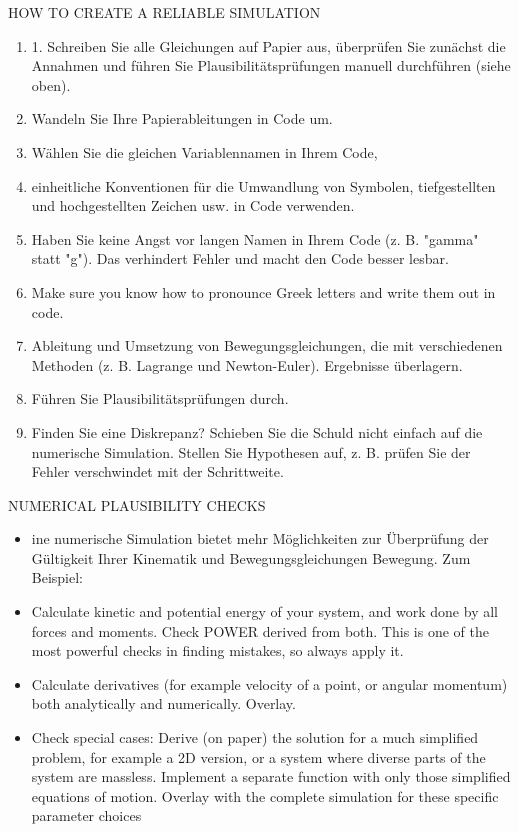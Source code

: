 HOW TO CREATE A RELIABLE SIMULATION
\begin{enumerate}

    \item 1. Schreiben Sie alle Gleichungen auf Papier aus, überprüfen Sie zunächst die Annahmen und führen Sie Plausibilitätsprüfungen 
manuell durchführen (siehe oben). 
    \item Wandeln Sie Ihre Papierableitungen in Code um. 
    \item Wählen Sie die gleichen Variablennamen in Ihrem Code,
    \item 
    einheitliche Konventionen für die Umwandlung von Symbolen, tiefgestellten und hochgestellten Zeichen usw. in Code verwenden. 
    \item Haben Sie keine Angst vor langen Namen in Ihrem Code (z. B. "gamma" statt "g"). Das verhindert Fehler und macht den Code besser lesbar. 
    \item Make sure you know how to pronounce Greek letters and write them out in code. 
    \item Ableitung und Umsetzung von Bewegungsgleichungen, die mit verschiedenen Methoden (z. B. Lagrange 
und Newton-Euler). Ergebnisse überlagern. 
    \item Führen Sie Plausibilitätsprüfungen durch. 
    \item Finden Sie eine Diskrepanz? Schieben Sie die Schuld nicht einfach auf die numerische Simulation. Stellen Sie Hypothesen auf, z. B. prüfen Sie 
der Fehler verschwindet mit der Schrittweite.
\end{enumerate}



NUMERICAL PLAUSIBILITY CHECKS
\begin{itemize}
    \item ine numerische Simulation bietet mehr Möglichkeiten zur Überprüfung der Gültigkeit Ihrer Kinematik und Bewegungsgleichungen 
Bewegung. Zum Beispiel:
    \item Calculate kinetic and potential energy of your system, and work done by all forces and 
moments. Check POWER derived from both. This is one of the most powerful checks in finding 
mistakes, so always apply it.
    \item Calculate derivatives (for example velocity of a point, or angular momentum) both analytically 
and numerically. Overlay. 
    \item Check special cases: Derive (on paper) the solution for a much simplified problem, for example 
a 2D version, or a system where diverse parts of the system are massless. Implement a 
separate function with only those simplified equations of motion. Overlay with the complete 
simulation for these specific parameter choices
\end{itemize}

